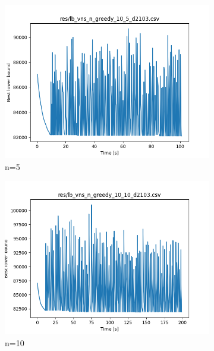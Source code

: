 \begin{figure}[!h]
	\begin{subfigure}{.5\columnwidth}
		\centering
		\includegraphics[width=\columnwidth]{../res/lb_vns_n_greedy_10_5_d2103.png}
		\caption{n=5}
		\label{fig:lb_vns_n_greedy_10_95_03_02_5_d2103}
	\end{subfigure}
	\begin{subfigure}{.5\columnwidth}
		\centering
		\includegraphics[width=\columnwidth]{../res/lb_vns_n_greedy_10_10_d2103.png}
		\caption{n=10}
		\label{fig:lb_vns_n_greedy_10_95_03_02_10_d2103}
	\end{subfigure}
	\begin{subfigure}{.5\columnwidth}
		\centering

\end{subfigure}
\end{figure}
